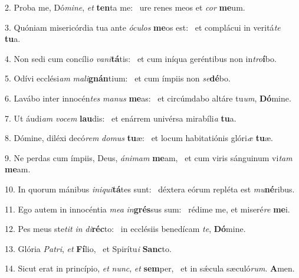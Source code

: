 2. Proba me, Dó\textit{mi}\textit{ne}, \textit{et} \textbf{ten}ta me: \ast\  ure renes meos et \textit{cor} \textbf{me}um.\

3. Quóniam misericórdia tua ante \textit{ó}\textit{cu}\textit{los} \textbf{me}os est: \ast\  et complácui in veritá\textit{te} \textbf{tu}a.\

4. Non sedi cum concíli\textit{o} \textit{va}\textit{ni}\textbf{tá}tis: \ast\  et cum iníqua geréntibus non in\textit{tro}\textbf{í}bo.\

5. Odívi ecclési\textit{am} \textit{ma}\textit{li}\textbf{gnán}tium: \ast\  et cum ímpiis non \textit{se}\textbf{dé}bo.\

6. Lavábo inter innocén\textit{tes} \textit{ma}\textit{nus} \textbf{me}as: \ast\  et circúmdabo altáre tu\textit{um}, \textbf{Dó}mine.\

7. Ut áudi\textit{am} \textit{vo}\textit{cem} \textbf{lau}dis: \ast\  et enárrem univérsa mirabíli\textit{a} \textbf{tu}a.\

8. Dómine, diléxi decó\textit{rem} \textit{do}\textit{mus} \textbf{tu}æ: \ast\  et locum habitatiónis glóri\textit{æ} \textbf{tu}æ.\

9. Ne perdas cum ímpiis, Deus, \textit{á}\textit{ni}\textit{mam} \textbf{me}am, \ast\  et cum viris sánguinum vi\textit{tam} \textbf{me}am.\

10. In quorum mánibus \textit{in}\textit{i}\textit{qui}\textbf{tá}tes sunt: \ast\  déxtera eórum repléta est \textit{mu}\textbf{né}ribus.\

11. Ego autem in innocéntia \textit{me}\textit{a} \textit{in}\textbf{grés}sus sum: \ast\  rédime me, et miseré\textit{re} \textbf{me}i.\

12. Pes meus ste\textit{tit} \textit{in} \textit{di}\textbf{réc}to: \ast\  in ecclésiis benedícam \textit{te}, \textbf{Dó}mine.\

13. Glória \textit{Pa}\textit{tri}, \textit{et} \textbf{Fí}lio, \ast\  et Spirítu\textit{i} \textbf{Sanc}to.\

14. Sicut erat in princípio, \textit{et} \textit{nunc}, \textit{et} \textbf{sem}per, \ast\  et in sǽcula sæculó\textit{rum}. \textbf{A}men.\

